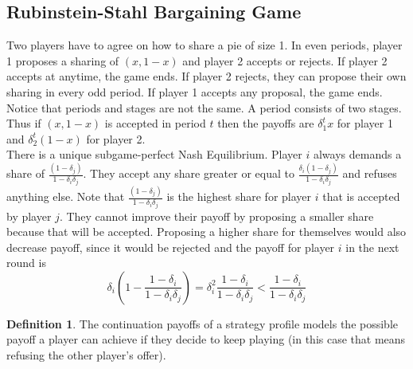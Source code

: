 \documentclass[a4paper, 12pt]{article}
\theoremstyle{plain}
\theoremstyle{definition}
\newtheorem{definition}[theorem]{Definition} %
\theoremstyle{lemma}
\theoremstyle{remark}
\theoremstyle{corollary}
\theoremstyle{example}
\begin{document}
	\subsection{Rubinstein-Stahl Bargaining Game}
	Two players have to agree on how to share a pie of size 1. In even periods, player 1 proposes a sharing of $(x,1-x)$ and player 2 accepts or rejects. If player 2 accepts at anytime, the game ends. If player 2 rejects, they can propose their own sharing in every odd period. If player 1 accepts any proposal, the game ends. Notice that periods and stages are not the same. A period consists of two stages. Thus if $(x,1-x)$ is accepted in period $t$ then the payoffs are $\delta_1^tx$ for player 1 and $\delta_2^t(1-x)$ for player 2.\\
	There is a unique subgame-perfect Nash Equilibrium. Player $i$ always demands a share of $\frac{(1-\delta_j)}{1-\delta_i\delta_j}$. They accept any share greater or equal to $\frac{\delta_i(1-\delta_j)}{1-\delta_i\delta_j}$ and refuses anything else. Note that $\frac{(1-\delta_j)}{1-\delta_i\delta_j}$ is the highest share for player $i$ that is accepted by player $j$. They cannot improve their payoff by proposing a smaller share because that will be accepted. Proposing a higher share for themselves would also decrease payoff, since it would be rejected and the payoff for player $i$ in the next round is \[\delta_i(1-\frac{1-\delta_i}{1-\delta_i\delta_j}) = \delta_i^2\frac{1-\delta_i}{1-\delta_i\delta_j} < \frac{1-\delta_i}{1-\delta_i\delta_j}\]
	\begin{definition}
		The continuation payoffs of a strategy profile models the possible payoff a player can achieve if they decide to keep playing (in this case that means refusing the other player's offer).
	\end{definition}
\end{document}
